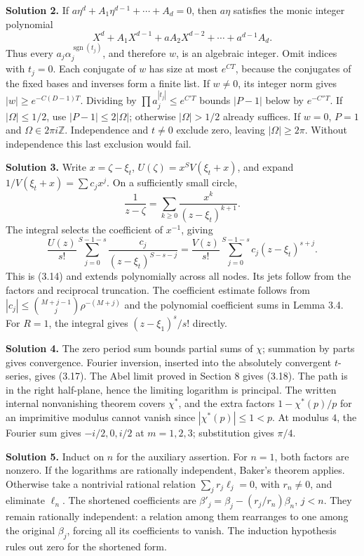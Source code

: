 \documentclass[
  11pt,
  a4paper,
]{article}
\begin{document}
\textbf{Solution 2.} If \(a\eta^d+A_1\eta^{d-1}+\cdots+A_d=0\), then
\(a\eta\) satisfies the monic integer polynomial \[
X^d+A_1X^{d-1}+aA_2X^{d-2}+\cdots+a^{d-1}A_d.
\] Thus every \(a_j\alpha_j^{\operatorname{sgn}(t_j)}\), and therefore
\(w\), is an algebraic integer. Omit indices with \(t_j=0\). Each
conjugate of \(w\) has size at most \(e^{CT}\), because the conjugates
of the fixed bases and inverses form a finite list. If \(w\ne0\), its
integer norm gives \(|w|\ge e^{-C(D-1)T}\). Dividing by
\(\prod a_j^{|t_j|}\le e^{C'T}\) bounds \(|P-1|\) below by
\(e^{-C''T}\). If \(|\Omega|\le1/2\), use \(|P-1|\le2|\Omega|\);
otherwise \(|\Omega|>1/2\) already suffices. If \(w=0\), \(P=1\) and
\(\Omega\in2\pi i\mathbb Z\). Independence and \(t\ne0\) exclude zero,
leaving \(|\Omega|\ge2\pi\). Without independence this last exclusion
would fail.

\textbf{Solution 3.} Write \(x=\zeta-\xi_t\),
\(U(\zeta)=x^SV(\xi_t+x)\), and expand \(1/V(\xi_t+x)=\sum c_jx^j\). On
a sufficiently small circle, \[
\frac1{z-\zeta}=\sum_{k\ge0}\frac{x^k}{(z-\xi_t)^{k+1}}.
\] The integral selects the coefficient of \(x^{-1}\), giving \[
\frac{U(z)}{s!}\sum_{j=0}^{S-1-s}
\frac{c_j}{(z-\xi_t)^{S-s-j}}
=\frac{V(z)}{s!}\sum_{j=0}^{S-1-s}c_j(z-\xi_t)^{s+j}.
\] This is (3.14) and extends polynomially across all nodes. Its jets
follow from the factors and reciprocal truncation. The coefficient
estimate follows from \(|c_j|\le\binom{M+j-1}{j}\rho^{-(M+j)}\) and the
polynomial coefficient sums in Lemma 3.4. For \(R=1\), the integral
gives \((z-\xi_1)^s/s!\) directly.

\textbf{Solution 4.} The zero period sum bounds partial sums of
\(\chi\); summation by parts gives convergence. Fourier inversion,
inserted into the absolutely convergent \(t\)-series, gives (3.17). The
Abel limit proved in Section 8 gives (3.18). The path is in the right
half-plane, hence the limiting logarithm is principal. The written
internal nonvanishing theorem covers \(\chi^*\), and the extra factors
\(1-\chi^*(p)/p\) for an imprimitive modulus cannot vanish since
\(|\chi^*(p)|\le1<p\). At modulus \(4\), the Fourier sum gives
\(-i/2,0,i/2\) at \(m=1,2,3\); substitution gives \(\pi/4\).

\textbf{Solution 5.} Induct on \(n\) for the auxiliary assertion. For
\(n=1\), both factors are nonzero. If the logarithms are rationally
independent, Baker's theorem applies. Otherwise take a nontrivial
rational relation \(\sum_jr_j\ell_j=0\), with \(r_n\ne0\), and eliminate
\(\ell_n\). The shortened coefficients are
\(\beta'_j=\beta_j-(r_j/r_n)\beta_n\), \(j<n\). They remain rationally
independent: a relation among them rearranges to one among the original
\(\beta_j\), forcing all its coefficients to vanish. The induction
hypothesis rules out zero for the shortened form.
\end{document}
